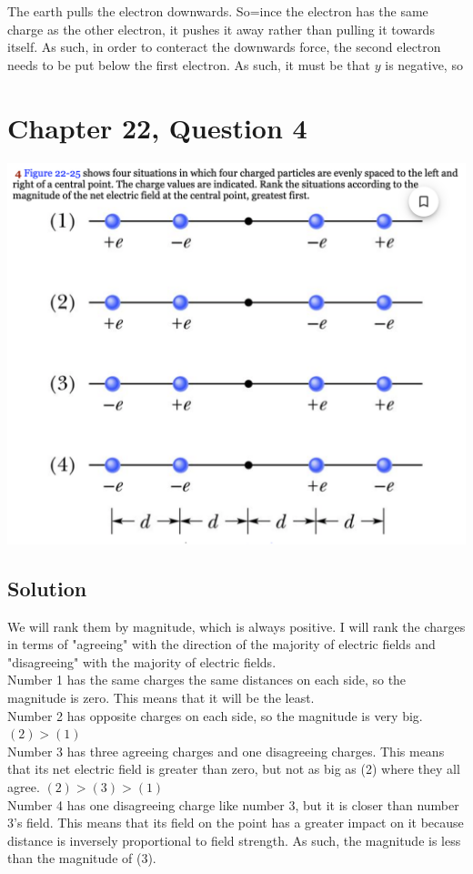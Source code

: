 \documentclass[12pt]{article}
\begin{document}
The earth pulls the electron downwards. So=ince the electron has the same charge as the other electron, it pushes it away rather than pulling it towards itself. As such, in order to conteract the downwards force, the second electron needs to be put below the first electron. As such, it must be that $y$ is negative, so 

\pagebreak
\section*{Chapter 22, Question 4}
\includegraphics[width=\textwidth]{picture_3.png}

\subsection*{Solution}
We will rank them by magnitude, which is always positive. I will rank the charges in terms of "agreeing" with the direction of the majority of electric fields and "disagreeing" with the majority of electric fields.\\
Number 1 has the same charges the same distances on each side, so the magnitude is zero. This means that it will be the least.\\
Number 2 has opposite charges on each side, so the magnitude is very big. $(2) > (1)$\\
Number 3 has three agreeing charges and one disagreeing charges. This means that its net electric field is greater than zero, but not as big as (2) where they all agree. $(2) > (3) > (1)$\\
Number 4 has one disagreeing charge like number 3, but it is closer than number 3's field. This means that its field on the point has a greater impact on it because distance is inversely proportional to field strength. As such, the magnitude is less than the magnitude of (3). 
\end{document}
